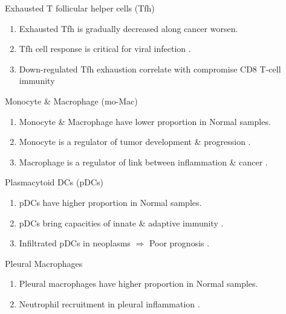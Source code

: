 \documentclass{beamer}
\begin{document}
\begin{frame}[allowframebreaks]
        \begin{block}{Exhausted T follicular helper cells (Tfh)}
            \begin{enumerate}
                \item Exhausted Tfh is gradually decreased along cancer worsen.
                \item Tfh cell response is critical for viral infection \cite{Tfh-1, Tfh-2}.
                \item Down-regulated Tfh exhaustion correlate with compromise CD8 T-cell immunity \cite{Tfh-3}
            \end{enumerate}
        \end{block}

        \begin{block}{Monocyte \& Macrophage (mo-Mac)}
            \begin{enumerate}
                \item Monocyte \& Macrophage have lower proportion in Normal samples.
                \item Monocyte is a regulator of tumor development \& progression \cite{monocyte-1}.
                \item Macrophage is a regulator of link between inflammation \& cancer \cite{macrophage-1}.
            \end{enumerate}
        \end{block}

        \begin{block}{Plasmacytoid DCs (pDCs)}
            \begin{enumerate}
                \item pDCs have higher proportion in Normal samples.
                \item pDCs bring capacities of innate \& adaptive immunity \cite{pDCs-1}.
                \item Infiltrated pDCs in neoplasms $\Rightarrow$ Poor prognosis \cite{pDCs-2}.
            \end{enumerate}
        \end{block}

        \begin{block}{Pleural Macrophages}
            \begin{enumerate}
                \item Pleural macrophages have higher proportion in Normal samples.
                \item Neutrophil recruitment in pleural inflammation \cite{PleuralMac-1}.
            \end{enumerate}
        \end{block}


\end{frame}
\end{document}
